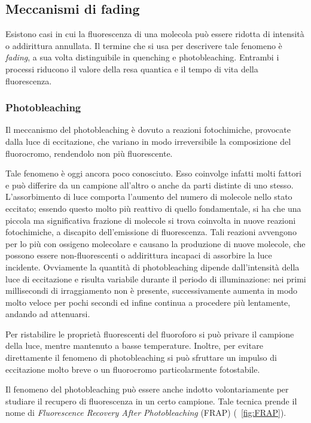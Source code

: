 \subsection{Meccanismi di fading}

Esistono casi in cui la fluorescenza di una molecola può essere ridotta di intensità o addirittura annullata. 
Il termine che si usa per descrivere tale fenomeno è \textit{fading}, a sua volta distinguibile in quenching e photobleaching.
Entrambi i processi riducono il valore della resa quantica e il tempo di vita della fluorescenza.

\subsubsection*{Photobleaching}
Il meccanismo del photobleaching è dovuto a reazioni fotochimiche, provocate dalla luce di eccitazione, che variano in modo irreversibile la composizione del fluorocromo, rendendolo non più fluorescente. 

Tale fenomeno è oggi ancora poco conosciuto.
Esso coinvolge infatti molti fattori e può differire da un campione all'altro o anche da parti distinte di uno stesso.
L'assorbimento di luce comporta l'aumento del numero di molecole nello stato eccitato; essendo questo molto più reattivo di quello fondamentale, si ha che una piccola ma significativa frazione di molecole si trova coinvolta in nuove reazioni fotochimiche, a discapito dell'emissione di fluorescenza. 
Tali reazioni avvengono per lo più con ossigeno molecolare e causano la produzione di nuove molecole, che possono essere non-fluorescenti o addirittura incapaci di assorbire la luce incidente.
Ovviamente la quantità di photobleaching dipende dall'intensità della luce di eccitazione e risulta variabile durante il periodo di illuminazione: nei primi millisecondi di irraggiamento non è presente, successivamente aumenta in modo molto veloce per pochi secondi ed infine continua a procedere  più lentamente, andando ad attenuarsi.

Per ristabilire le proprietà fluorescenti del fluoroforo si può privare il campione della luce, mentre mantenuto a basse temperature. 
Inoltre, per evitare direttamente il fenomeno di photobleaching si può sfruttare un impulso di eccitazione molto breve o un fluorocromo particolarmente fotostabile.

Il fenomeno del photobleaching può essere anche indotto volontariamente per studiare il recupero di fluorescenza in un certo campione. 
Tale tecnica prende il nome di \textit{Fluorescence Recovery After Photobleaching} (FRAP) (\figurename~\ref{fig:FRAP}).

